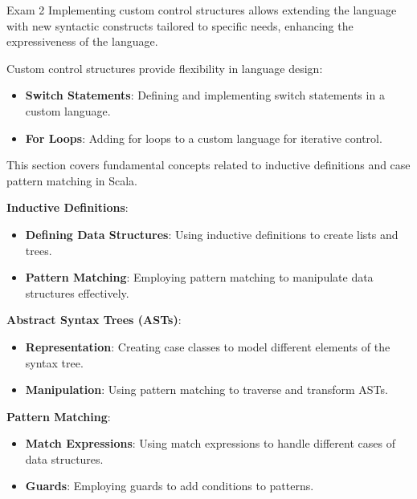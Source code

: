\begin{examnotes}{Exam 2}
    Implementing custom control structures allows extending the language with new syntactic constructs tailored to specific needs, enhancing the expressiveness of the language.
    
    \begin{highlight}
        Custom control structures provide flexibility in language design:
        \begin{itemize}
            \item \textbf{Switch Statements}: Defining and implementing switch statements in a custom language.
            \item \textbf{For Loops}: Adding for loops to a custom language for iterative control.
        \end{itemize}
    \end{highlight}
    
    \begin{highlight}
        This section covers fundamental concepts related to inductive definitions and case pattern matching in Scala.
    
        \textbf{Inductive Definitions}:
        \begin{itemize}
            \item \textbf{Defining Data Structures}: Using inductive definitions to create lists and trees.
            \item \textbf{Pattern Matching}: Employing pattern matching to manipulate data structures effectively.
        \end{itemize}
        
        \textbf{Abstract Syntax Trees (ASTs)}:
        \begin{itemize}
            \item \textbf{Representation}: Creating case classes to model different elements of the syntax tree.
            \item \textbf{Manipulation}: Using pattern matching to traverse and transform ASTs.
        \end{itemize}
        
        \textbf{Pattern Matching}:
        \begin{itemize}
            \item \textbf{Match Expressions}: Using match expressions to handle different cases of data structures.
            \item \textbf{Guards}: Employing guards to add conditions to patterns.
        \end{itemize}
        

\end{highlight}
\end{examnotes}
